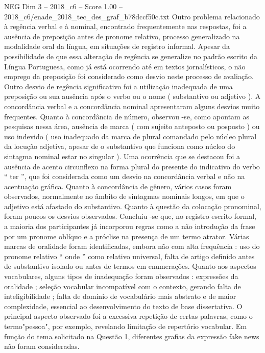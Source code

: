 \begin{textsample}{NEG Dim 3 – 2018\_c6 – Score 1.00 – 2018\_c6/enade\_2018\_tec\_des\_graf\_b78dccf50c.txt}
Outro problema relacionado à regência verbal e à nominal, encontrado frequentemente nas respostas, foi a ausência de preposição antes de pronome relativo, processo generalizado na modalidade oral da língua, em situações de registro informal.
Apesar da possibilidade de que essa alteração de regência se generalize no padrão escrito da Língua Portuguesa, como já está ocorrendo até em textos jornalísticos, o não emprego da preposição foi considerado como desvio neste processo de avaliação.
Outro desvio de regência significativo foi a utilização inadequada de uma preposição ou sua ausência após o verbo ou o nome ( substantivo ou adjetivo ).
A concordância verbal e a concordância nominal apresentaram alguns desvios muito frequentes.
Quanto à concordância de número, observou -se, como apontam as pesquisas nessa área, ausência de marca ( com sujeito anteposto ou posposto ) ou uso indevido ( uso inadequado da marca de plural comandado pelo núcleo plural da locução adjetiva, apesar de o substantivo que funciona como núcleo do sintagma nominal estar no singular ).
Uma ocorrência que se destacou foi a ausência de acento circunflexo na forma plural do presente do indicativo do verbo “ ter ”, que foi considerada como um desvio na concordância verbal e não na acentuação gráfica.
Quanto à concordância de gênero, vários casos foram observados, normalmente no âmbito de sintagmas nominais longos, em que o adjetivo está afastado do substantivo.
Quanto à questão da colocação pronominal, foram poucos os desvios observados.
Concluiu -se que, no registro escrito formal, a maioria dos participantes já incorporou regras como a não introdução da frase por um pronome oblíquo e a próclise na presença de um termo atrator.
Várias marcas de oralidade foram identificadas, embora não com alta frequência : uso do pronome relativo “ onde ” como relativo universal, falta de artigo definido antes de substantivo isolado ou antes de termos em enumerações.
Quanto aos aspectos vocabulares, alguns tipos de inadequação foram observados : expressões da oralidade ; seleção vocabular incompatível com o contexto, gerando falta de inteligibilidade ; falta de domínio de vocabulário mais abstrato e de maior complexidade, essencial ao desenvolvimento do texto de base dissertativa.
O principal aspecto observado foi a excessiva repetição de certas palavras, como o termo"pessoa", por exemplo, revelando limitação de repertório vocabular.
Em função do tema solicitado na Questão 1, diferentes grafias da expressão fake news não foram consideradas.

\end{textsample}
